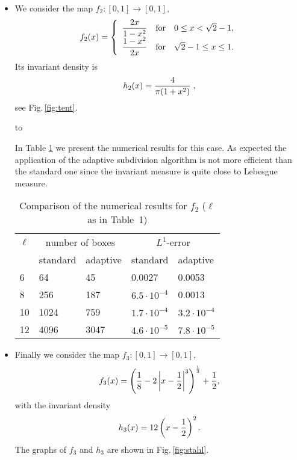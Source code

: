 \documentclass[cvs,envcountsect]{svjour}
\begin{document}
\begin{itemize}
\item[{\it 2.}] We consider the map $f_2:[0,1]\to [0,1]$,
\renewcommand{\arraystretch}{2.1}
\[
f_2(x)=\left\{
\begin{array}{ll}
\displaystyle{2x\over 1-x^2} & \mbox{for}\quad 0\le x< \sqrt{2}-1, \\
\displaystyle{1-x^2\over 2x} & \mbox{for}\quad \sqrt{2}-1 \le x \le 1.
\end{array}
\right.
\]
\renewcommand{\arraystretch}{1.0}
Its invariant density is
\[
h_2(x)= {4\over \pi (1+x^2)}\; ,
\]
see Fig.\,\ref{fig:tent}.

\begin{figure*}
\vbox{\hbox to}
\label{fig:tent}
\end{figure*}

In Table \ref{tab:tent} we present the numerical results
for this case. As expected the application of the adaptive
subdivision algorithm is not more efficient than the
standard one since the invariant measure is quite close to Lebesgue
measure.

\begin{table}
\caption[]{Comparison of the numerical results for $f_2$
           ($\ell$ as in Table~1)}
\label{tab:tent}
\begin{tabular}{ l l l l l }
\hline
$\ell$ &
\multicolumn{2}{c}{number of boxes} & \multicolumn{2}{c}{$L^1$-error} \\
  & standard & adaptive & standard & adaptive \\ \hline
6  & 64   &   45 &           0.0027 &             0.0053 \\
8  & 256  &  187 & $6.5\cdot 10^{-4}$ &           0.0013 \\
10 & 1024 &  759 & $1.7\cdot 10^{-4}$ & $3.2\cdot 10^{-4}$ \\
12 & 4096 & 3047 & $4.6\cdot 10^{-5}$ & $7.8\cdot 10^{-5}$ \\
\hline
\end{tabular}
\end{table}

\item[{\it 3.}] Finally we consider the map $f_3:[0,1]\to [0,1]$,
\[
f_3(x) = \left({1\over 8} -2 \left|x-{1\over 2}\right|^3\right)^{1\over 3}
+ {1\over 2},
\]
with the invariant density
\[
h_3(x) = 12\left(x-{1\over 2}\right)^2.
\]
The graphs of $f_3$ and $h_3$ are shown in Fig.\,\ref{fig:stahl}.


\end{itemize}
\end{document}
